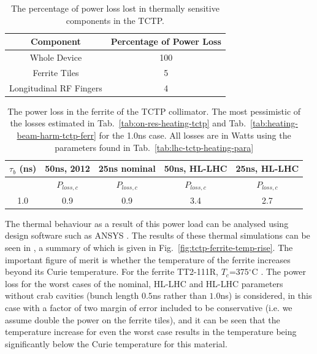 \begin{table}
\caption{The percentage of power loss lost in thermally sensitive components in the TCTP.}
\label{tab:tctp-heating-loc}
\begin{center}
\begin{tabular}{c | c}
Component & Percentage of Power Loss \\ \hline
Whole Device & 100 \\ \hline
Ferrite Tiles & 5 \\ \hline
Longitudinal RF Fingers & 4 \\
\end{tabular}
\end{center}
\end{table}

\begin{table}
\caption{The power loss in the ferrite of the TCTP collimator. The most pessimistic of the losses estimated in Tab.~\ref{tab:on-res-heating-tctp} and Tab.~\ref{tab:heating-beam-harm-tctp-ferr} for the 1.0ns case. All losses are in Watts using the parameters found in Tab.~\ref{tab:lhc-tctp-heating-para}}
\label{tab:heating-ferr-power-load}
\begin{center}
\begin{tabular}{c | c | c | c | c }
$\tau_{b}$ (ns) & 50ns, 2012 & 25ns nominal & 50ns, HL-LHC & 25ns, HL-LHC \\ \hline
 &  $P_{loss, c}$  & $P_{loss, c}$ &  $P_{loss, c}$  & $P_{loss, c}$ \\ \hline
1.0 & 0.9 & 0.9 & 3.4 & 2.7 
\end{tabular}
\end{center}
\end{table}


The thermal behaviour as a result of this power load can be analysed using design software such as ANSYS \cite{ansys}. The results of these thermal simulations can be seen in \cite{Carra:HeatLoad}, a summary of which is given in Fig.~\ref{fig:tctp-ferrite-temp-rise}. The important figure of merit is whether the temperature of the ferrite increases beyond its Curie temperature. For the ferrite TT2-111R, $T_{c}$=375$^{\circ}$C \cite{tt2111r:datSheet}. The power loss for the worst cases of the nominal, HL-LHC and HL-LHC parameters without crab cavities (bunch length $0.5$ns rather than $1.0$ns) is considered, in this case with a factor of two margin of error included to be conservative (i.e. we assume double the power on the ferrite tiles), and it can be seen that the temperature increase for even the worst case results in the temperature being significantly below the Curie temperature for this material.

